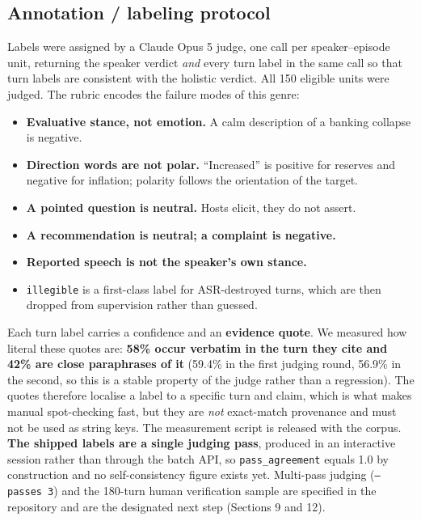 \documentclass[11pt,a4paper]{article}
\begin{document}
\subsection{Annotation / labeling protocol}

Labels were assigned by a Claude Opus 5 judge, one call per speaker--episode unit, returning the
speaker verdict \emph{and} every turn label in the same call so that turn labels are consistent
with the holistic verdict. All 150 eligible units were judged. The rubric encodes the failure modes of this genre:

\begin{itemize}[leftmargin=1.4em,itemsep=2pt,topsep=2pt]
  \item \textbf{Evaluative stance, not emotion.} A calm description of a banking collapse is negative.
  \item \textbf{Direction words are not polar.} ``Increased'' is positive for reserves and negative for inflation; polarity follows the orientation of the target.
  \item \textbf{A pointed question is neutral.} Hosts elicit, they do not assert.
  \item \textbf{A recommendation is neutral; a complaint is negative.}
  \item \textbf{Reported speech is not the speaker's own stance.}
  \item \texttt{illegible} is a first-class label for ASR-destroyed turns, which are then dropped from supervision rather than guessed.
\end{itemize}

Each turn label carries a confidence and an \textbf{evidence quote}. We measured how literal these
quotes are: \textbf{58\% occur verbatim in the turn they cite and 42\% are close paraphrases of it}
(59.4\% in the first judging round, 56.9\% in the second, so this is a stable property of the judge
rather than a regression). The quotes therefore localise a label to a specific turn and claim,
which is what makes manual spot-checking fast, but they are \emph{not} exact-match provenance
and must not be used as string keys. The measurement script is released with the corpus. \textbf{The shipped labels are a single judging pass}, produced in an
interactive session rather than through the batch API, so \texttt{pass\_agreement} equals 1.0 by
construction and no self-consistency figure exists yet. Multi-pass judging
(\texttt{--passes 3}) and the 180-turn human verification sample are specified in the repository
and are the designated next step (Sections 9 and 12).
\end{document}
